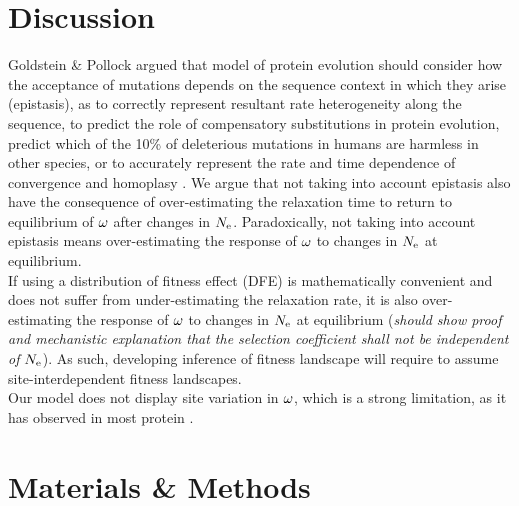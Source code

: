 \documentclass{article}
\begin{document}
\section{Discussion}

Goldstein \& Pollock argued that model of protein evolution should consider how the acceptance of mutations depends on the sequence context in which they arise (epistasis), as to correctly represent resultant rate heterogeneity along the sequence, to predict the role of compensatory substitutions in protein evolution, predict which of the 10\% of deleterious mutations in humans are harmless in other species, or to accurately represent the rate and time dependence of convergence and homoplasy \cite{Goldstein2017}.
We argue that not taking into account epistasis also have the consequence of over-estimating the relaxation time to return to equilibrium of $\omega$ after changes in $N_{\mathrm{e}}$.
Paradoxically, not taking into account epistasis means over-estimating the response of $\omega$ to changes in $N_{\mathrm{e}}$ at equilibrium.\\



If using a distribution of fitness effect (DFE) is mathematically convenient and does not suffer from under-estimating the relaxation rate, it is also over-estimating the response of $\omega$ to changes in $N_{\mathrm{e}}$ at equilibrium (\textit{should show proof and mechanistic explanation that the selection coefficient shall not be independent of $N_{\mathrm{e}}$}).
As such, developing inference of fitness landscape will require to assume site-interdependent fitness landscapes.\\

Our model does not display site variation in $\omega$, which is a strong limitation, as it has observed in most protein \cite{Echave2017}.
\section{Materials \& Methods}
\end{document}
